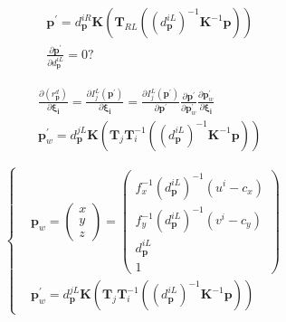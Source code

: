 \documentclass{article}
\begin{document}
\begin{CJK*}{GBK}{song}
\begin{equation}\left.\begin{aligned}
&
\textbf{p}^{'}=d_\textbf{p}^{iR}\textbf{K}(\textbf{T}_{RL}((d_\textbf{p}^{iL})^{-1}\textbf{K}^{-1}\textbf{p}))
\\&
\frac{\partial{\textbf{p}^{'}}}{\partial{d_\textbf{p}^{iL}}} = 0 ?
\end{aligned}\tag{2.2}\right.\end{equation}


\begin{equation}\left.\begin{aligned}
&
\frac{\partial{(r^{d}_{\textbf{p}})}}{\partial{\boldsymbol{\xi_{i}}}} =
\frac{\partial{I^L_j(\textbf{p}^{'})}}{\partial{\boldsymbol{\xi_{i}}}}  =
\frac{\partial{I^L_j(\textbf{p}^{'})}}{\partial{\textbf{p}^{'}}}
\frac{\partial{\textbf{p}^{'}}}{\partial{\textbf{p}^{'}_{w}}}
\frac{\partial{\textbf{p}^{'}_{w}}}{\partial{\boldsymbol{\xi_{i}}}}
\\&
\textbf{p}^{'}_{w}=d_\textbf{p}^{jL}\textbf{K}(\textbf{T}_j\textbf{T}_i^{-1}((d_\textbf{p}^{iL})^{-1}\textbf{K}^{-1}\textbf{p}))
\end{aligned}\tag{2.2}\right.\end{equation}

\begin{equation}\left\{\begin{aligned}
&
\textbf{p}_{w}=
\begin{pmatrix}
x\\y\\z
\end{pmatrix}
=\begin{pmatrix}
f_x^{-1}(d_\textbf{p}^{iL})^{-1}(u^i-c_x)\\f_y^{-1}(d_\textbf{p}^{iL})^{-1}(v^i-c_y)\\d_\textbf{p}^{iL}\\1
\end{pmatrix}
\\&
\textbf{p}^{'}_{w}=d_\textbf{p}^{jL}\textbf{K}(\textbf{T}_j\textbf{T}_i^{-1}((d_\textbf{p}^{iL})^{-1}\textbf{K}^{-1}\textbf{p}))
\end{aligned}\tag{2.2}\right.\end{equation}


\end{CJK*}
\end{document}
